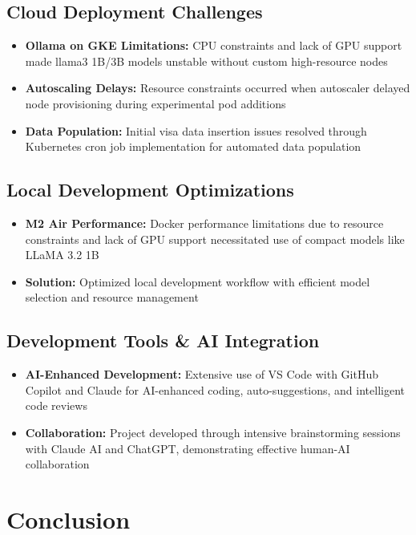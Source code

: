 \documentclass[11pt,a4paper]{article}
\begin{document}
\subsection{Cloud Deployment Challenges}
\begin{itemize}[itemsep=0.3em]
    \item \textbf{Ollama on GKE Limitations:} CPU constraints and lack of GPU support made llama3 1B/3B models unstable without custom high-resource nodes
    \item \textbf{Autoscaling Delays:} Resource constraints occurred when autoscaler delayed node provisioning during experimental pod additions
    \item \textbf{Data Population:} Initial visa data insertion issues resolved through Kubernetes cron job implementation for automated data population
\end{itemize}

\subsection{Local Development Optimizations}
\begin{itemize}[itemsep=0.3em]
    \item \textbf{M2 Air Performance:} Docker performance limitations due to resource constraints and lack of GPU support necessitated use of compact models like LLaMA 3.2 1B
    \item \textbf{Solution:} Optimized local development workflow with efficient model selection and resource management
\end{itemize}

\subsection{Development Tools \& AI Integration}
\begin{itemize}[itemsep=0.3em]
    \item \textbf{AI-Enhanced Development:} Extensive use of VS Code with GitHub Copilot and Claude for AI-enhanced coding, auto-suggestions, and intelligent code reviews
    \item \textbf{Collaboration:} Project developed through intensive brainstorming sessions with Claude AI and ChatGPT, demonstrating effective human-AI collaboration
\end{itemize}

\newpage
\section{Conclusion}
\end{document}
